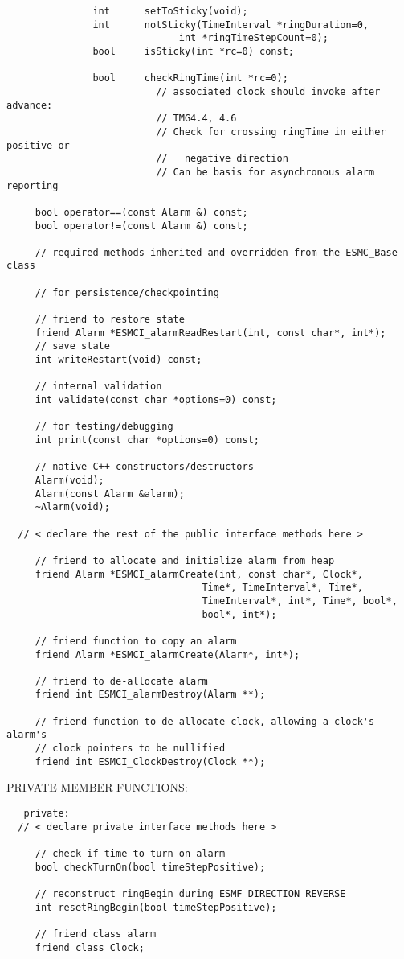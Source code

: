 \begin{verbatim}
               int      setToSticky(void);
               int      notSticky(TimeInterval *ringDuration=0,
                              int *ringTimeStepCount=0);
               bool     isSticky(int *rc=0) const;
 
               bool     checkRingTime(int *rc=0);
                          // associated clock should invoke after advance:
                          // TMG4.4, 4.6
                          // Check for crossing ringTime in either positive or
                          //   negative direction
                          // Can be basis for asynchronous alarm reporting
 
     bool operator==(const Alarm &) const; 
     bool operator!=(const Alarm &) const; 
 
     // required methods inherited and overridden from the ESMC_Base class
 
     // for persistence/checkpointing
 
     // friend to restore state
     friend Alarm *ESMCI_alarmReadRestart(int, const char*, int*);
     // save state
     int writeRestart(void) const;
 
     // internal validation
     int validate(const char *options=0) const;
 
     // for testing/debugging
     int print(const char *options=0) const;
 
     // native C++ constructors/destructors
     Alarm(void);
     Alarm(const Alarm &alarm);
     ~Alarm(void);
 
  // < declare the rest of the public interface methods here >
 
     // friend to allocate and initialize alarm from heap
     friend Alarm *ESMCI_alarmCreate(int, const char*, Clock*, 
                                  Time*, TimeInterval*, Time*, 
                                  TimeInterval*, int*, Time*, bool*,
                                  bool*, int*);
 
     // friend function to copy an alarm
     friend Alarm *ESMCI_alarmCreate(Alarm*, int*);
 
     // friend to de-allocate alarm
     friend int ESMCI_alarmDestroy(Alarm **);
 
     // friend function to de-allocate clock, allowing a clock's alarm's
     // clock pointers to be nullified
     friend int ESMCI_ClockDestroy(Clock **);
 \end{verbatim}{\sf PRIVATE MEMBER FUNCTIONS:}
\begin{verbatim}   private:
  // < declare private interface methods here >
 
     // check if time to turn on alarm
     bool checkTurnOn(bool timeStepPositive);
 
     // reconstruct ringBegin during ESMF_DIRECTION_REVERSE
     int resetRingBegin(bool timeStepPositive);
 
     // friend class alarm
     friend class Clock;
 \end{verbatim}

\setlength{\parskip}{\oldparskip}
\setlength{\parindent}{\oldparindent}
\setlength{\baselineskip}{\oldbaselineskip}
